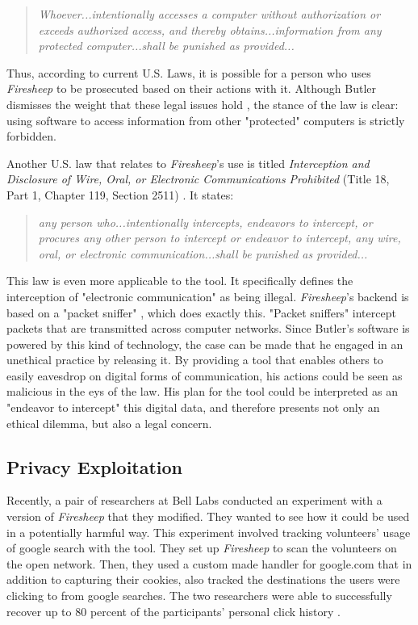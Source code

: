 \documentclass[11pt]{article}
\begin{document}
\begin{multicols}{2}
\begin{quote}
  \emph{Whoever...intentionally accesses a computer without authorization or exceeds authorized access, and thereby obtains...information from any protected computer...shall be punished as provided...} \cite{law_1}
\end{quote}

Thus, according to current U.S. Laws, it is possible for a person who uses \emph{Firesheep} to be prosecuted based on their actions with it. Although Butler dismisses the weight that these legal issues hold \cite{codebutler_blog_2}, the stance of the law is clear: using software to access information from other "protected" computers is strictly forbidden.

Another U.S. law that relates to \emph{Firesheep}'s use is titled \emph{Interception and Disclosure of Wire, Oral, or Electronic Communications Prohibited} (Title 18, Part 1, Chapter 119, Section 2511) \cite{law_2}. It states:

\begin{quote}
  \emph{any person who...intentionally intercepts, endeavors to intercept, or procures any other person to intercept or endeavor to intercept, any wire, oral, or electronic communication...shall be punished as provided...} \cite{law_2}
\end{quote}

This law is even more applicable to the tool. It specifically defines the interception of "electronic communication" as being illegal. \emph{Firesheep}'s backend is based on a "packet sniffer" \cite{github}, which does exactly this. "Packet sniffers" intercept packets that are transmitted across computer networks. Since Butler's software is powered by this kind of technology, the case can be made that he engaged in an unethical practice by releasing it. By providing a tool that enables others to easily eavesdrop on digital forms of communication, his actions could be seen as malicious in the eys of the law. His plan for the tool could be interpreted as an "endeavor to intercept" this digital data, and therefore presents not only an ethical dilemma, but also a legal concern.
\subsection{Privacy Exploitation}
Recently, a pair of researchers at Bell Labs conducted an experiment with a version of \emph{Firesheep} that they modified. They wanted to see how it could be used in a potentially harmful way. This experiment involved tracking volunteers' usage of google search with the tool. They set up \emph{Firesheep} to scan the volunteers on the open network. Then, they used a custom made handler for google.com that in addition to capturing their cookies, also tracked the destinations the users were clicking to from google searches. The two researchers were able to successfully recover up to 80 percent of the participants' personal click history \cite{show_me_your_cookie}.


\end{multicols}
\end{document}
